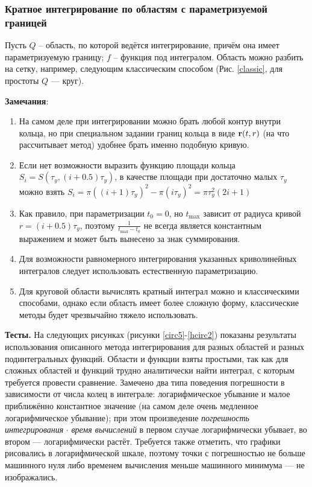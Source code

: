 \documentclass[a4paper, 12pt]{article}
\begin{document}
  
\subsubsection{Кратное интегрирование по областям с параметризуемой границей}
Пусть $Q$ -- область, по которой ведётся интегрирование, причём она имеет параметризуемую границу; $f$ -- функция под интегралом. Область можно разбить на сетку, например, следующим классическим способом (Рис. \ref{classic}, для простоты $Q$ --- круг).

{\bf Замечания}:
\begin{enumerate}
  \item На самом деле при интегрировании можно брать любой контур внутри кольца, но при специальном задании границ кольца в виде ${\bf r}(t,r)$ (на что рассчитывает метод) удобнее брать именно подобную кривую.
   \item Если нет возможности выразить функцию площади кольца $S_i=S(\tau_y,(i+0.5)\tau_y)$, в качестве площади при достаточно малых $\tau_y$ можно взять $S_i=\pi ((i+1)\tau_y)^2-\pi (i \tau_y)^2= \pi \tau^2_y (2i+1)$
   \item Как правило, при параметризации $t_0=0$, но $t_{\max}$ зависит от радиуса кривой $r=(i+0.5)\tau_y$, поэтому $\frac{1}{t_{\max}-t_0}$ не всегда является константным выражением и может быть вынесено за знак суммирования.
\item Для возможности равномерного интегрирования указанных криволинейных интегралов следует использовать естественную параметризацию.
\item Для круговой области вычислять кратный интеграл можно и классическими способами, однако если область имеет более сложную форму, классические методы будет чрезвычайно тяжело использовать. 
\end{enumerate}

{\bf Тесты.} На следующих рисунках (рисунки \ref{circ5}-\ref{hcirc2}) показаны результаты использования описанного метода интегрирования для разных областей и разных подинтегральных функций.
Области и функции взяты простыми, так как для сложных областей и функций трудно  аналитически найти интеграл, с которым требуется провести сравнение.
Замечено два типа поведения погрешности в зависимости от числа колец в интеграле: логарифмическое убывание и малое приближённо константное значение (на самом деле очень медленное логарифмическое убывание); при этом произведение {\it погрешность интегрирования} $\cdot$ {\it время вычислений} в первом случае логарифмически убывает, во втором --- логарифмически растёт.
Требуется также отметить, что графики рисовались в логарифмической шкале, поэтому точки с погрешностью не больше машинного нуля либо временем вычисления меньше машинного минимума --- не изображались. 
\end{document}
